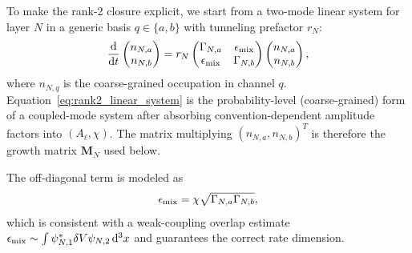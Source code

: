 \documentclass[aps,prd,onecolumn,notitlepage,nofootinbib,superscriptaddress,11pt,floatfix]{revtex4-2}
\newcommand{\dd}{\mathrm{d}}
\begin{document}
To make the rank-2 closure explicit, we start from a two-mode linear system for layer $N$ in a generic basis $q\in\{a,b\}$ with tunneling prefactor $r_N$:
\begin{equation}
\frac{\dd}{\dd t}
\begin{pmatrix}
n_{N,a}\\
n_{N,b}
\end{pmatrix}
=
r_N
\begin{pmatrix}
\Gamma_{N,a} & \epsilon_{\rm mix}\\
\epsilon_{\rm mix} & \Gamma_{N,b}
\end{pmatrix}
\begin{pmatrix}
n_{N,a}\\
n_{N,b}
\end{pmatrix},
\label{eq:rank2_linear_system}
\end{equation}
where $n_{N,q}$ is the coarse-grained occupation in channel $q$.
Equation~\eqref{eq:rank2_linear_system} is the probability-level (coarse-grained) form of a coupled-mode system after absorbing convention-dependent amplitude factors into $(A_\ell,\chi)$.
The matrix multiplying $(n_{N,a},n_{N,b})^T$ is therefore the growth matrix $\mathbf{M}_N$ used below.

The off-diagonal term is modeled as
\begin{equation}
\epsilon_{\rm mix} = \chi \sqrt{\Gamma_{N,a}\Gamma_{N,b}},
\label{eq:epsmix_model}
\end{equation}
which is consistent with a weak-coupling overlap estimate
$\epsilon_{\rm mix}\sim \int \psi_{N,1}^* \delta V \psi_{N,2}\,\dd^3x$ and guarantees the correct rate dimension.
\end{document}
